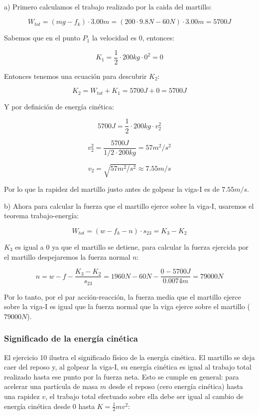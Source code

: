 \documentclass{article}
\newcommand{\newtitle}[1]{
    \color{titleColor}
    \subsubsection{#1}
    \color{black}
}
\newcommand{\newex}[1]{
    \vspace{0.5cm}
    \noindent{\large \color{exerciceColor} \textbf{#1}}\\[0.2cm]
}
\begin{document}
    \newex{Solución 10.}

    \par a) Primero calculamos el trabajo realizado por la caida del martillo:

    \[ W_{tot} = (mg - f_{k}) \cdot 3.00 m = (200 \cdot 9.8 N - 60 N) \cdot 3.00 m = 5700 J\]

    \par Sabemos que en el punto $P_1$ la velocidad es 0, entonces:

    \[ K_1 = \frac{1}{2} \cdot 200 kg \cdot 0^2 = 0 \]

    \par Entonces tenemos una ecuación para descubrir $K_2$:

    \[ K_2 = W_{tot} + K_1 = 5700 J + 0 = 5700 J \]

    \par Y por definición de energía cinética:

    \[ 5700J = \frac{1}{2} \cdot 200 kg \cdot v_2^2 \]

    \[ v_2^2 = \frac{5700 J}{1/2 \cdot 200 kg} = 57 m^2/s^2 \]

    \[ v_2 = \sqrt{57 m^2/s^2} \approx 7.55 m/s \]

    \par Por lo que la rapidez del martillo justo antes de golpear la viga-I es de $7.55 m/s$.

    \vspace{1cm}

    \par b) Ahora para calcular la fuerza que el martillo ejerce sobre la viga-I, usaremos el teorema trabajo-energía:

    \[ W_{tot} = (w - f_k - n) \cdot s_{23} = K_3 - K_2 \]

    \par $K_3$ es igual a 0 ya que el martillo se detiene, para calcular la fuerza ejercida por el martillo despejaremos la fuerza normal $n$:

    \[ n = w - f - \frac{K_3 - K_2}{s_{23}} = 1960 N - 60 N - \frac{0 - 5700 J}{0.0074 m} = 79000 N \]

    \par Por lo tanto, por el par acción-reacción, la fuerza media que el martillo ejerce sobre la viga-I es igual que la fuerza normal que la viga ejerce sobre el martillo ($79000 N$).

    \newtitle{Significado de la energía cinética}

    \par El ejercicio 10 ilustra el significado físico de la energía cinética. El martillo se deja caer del reposo y, al golpear la viga-I, su energía cinética es igual al trabajo total realizado hasta ese punto por la fuerza neta. Esto se cumple en general: para acelerar una partícula de masa $m$ desde el reposo (cero energía cinética) hasta una rapidez $v$, el trabajo total efectuado sobre ella debe ser igual al cambio de energía cinética desde 0 hasta $K = \frac{1}{2}mv^2$:
\end{document}
